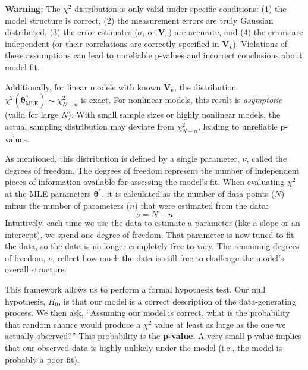 \begin{warningBox}
    \textbf{Warning:} The $\chi^2$ distribution is only valid under specific conditions: (1) the model structure is correct, (2) the measurement errors are truly Gaussian distributed, (3) the error estimates ($\sigma_i$ or $\mathbf{V}_{\boldsymbol{\epsilon}}$) are accurate, and (4) the errors are independent (or their correlations are correctly specified in $\mathbf{V}_{\boldsymbol{\epsilon}}$). Violations of these assumptions can lead to unreliable p-values and incorrect conclusions about model fit.

    Additionally, for linear models with known $\mathbf{V}_{\boldsymbol{\epsilon}}$, the distribution $\chi^2(\boldsymbol{\theta}^*_{\text{MLE}}) \sim \chi^2_{N-n}$ is exact. For nonlinear models, this result is \textit{asymptotic} (valid for large $N$). With small sample sizes or highly nonlinear models, the actual sampling distribution may deviate from $\chi^2_{N-n}$, leading to unreliable p-values.
\end{warningBox}
As mentioned, this distribution is defined by a single parameter, $\nu$, called the degrees of freedom. The degrees of freedom represent the number of independent pieces of information available for assessing the model's fit. When evaluating $\chi^2$ at the MLE parameters $\boldsymbol{\theta}^*$, it is calculated as the number of data points ($N$) minus the number of parameters ($n$) that were estimated from the data:
\begin{equation}
    \nu = N - n
\end{equation}
Intuitively, each time we use the data to estimate a parameter (like a slope or an intercept), we spend one degree of freedom. That parameter is now tuned to fit the data, so the data is no longer completely free to vary. The remaining degrees of freedom, $\nu$, reflect how much the data is still free to challenge the model's overall structure.

This framework allows us to perform a formal hypothesis test. Our null hypothesis, $H_0$, is that our model is a correct description of the data-generating process. We then ask, ``Assuming our model is correct, what is the probability that random chance would produce a $\chi^2$ value at least as large as the one we actually observed?'' This probability is the \textbf{p-value}. A very small p-value implies that our observed data is highly unlikely under the model (i.e., the model is probably a poor fit).

